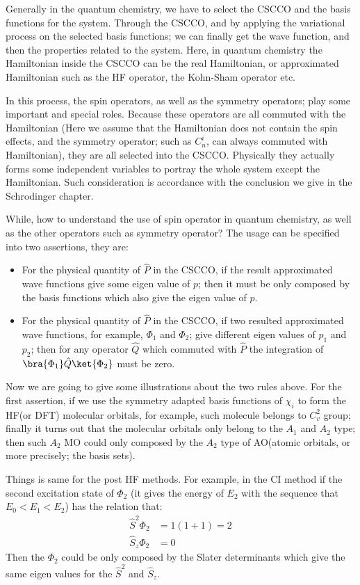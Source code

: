 Generally in the quantum chemistry, we have to select the CSCCO and
the basis functions for the system. Through the CSCCO, and by
applying the variational process on the selected basis functions; we
can finally get the wave function, and then the properties related
to the system. Here, in quantum chemistry the Hamiltonian inside the
CSCCO can be the real Hamiltonian, or approximated Hamiltonian such
as the HF operator, the Kohn-Sham operator etc.

In this process, the spin operators, as well as the symmetry
operators; play some important and special roles. Because these
operators are all commuted with the Hamiltonian (Here we assume that
the Hamiltonian does not contain the spin effects, and the symmetry
operator; such as $C^{i}_{n}$, can always commuted with
Hamiltonian), they are all selected into the CSCCO. Physically they
actually forms some independent variables to portray the whole
system except the Hamiltonian. Such consideration is accordance with
the conclusion we give in the Schrodinger chapter.

While, how to understand the use of spin operator in quantum
chemistry, as well as the other operators such as symmetry operator?
The usage can be specified into two assertions, they are:
\begin{itemize}
  \item  For the physical quantity of $\hat{P}$ in the CSCCO, if
the result approximated wave functions give some eigen value of $p$;
then it must be only composed by the basis functions which also give
the eigen value of $p$.
  \item  For the physical quantity of $\hat{P}$ in the CSCCO, if two
resulted approximated wave functions, for example, $\Phi_{1}$ and
$\Phi_{2}$; give different eigen values of $p_{1}$ and $p_{2}$; then
for any operator $\hat{Q}$ which commuted with $\hat{P}$ the
integration of $\bra{\Phi_{1}}\hat{Q}\ket{\Phi_{2}}$ must be zero.
\end{itemize}

Now we are going to give some illustrations about the two rules
above. For the first assertion, if we use the symmetry adapted basis
functions of $\chi_{i}$ to form the HF(or DFT) molecular orbitals, for
example, such molecule belongs to $C^{2}_{v}$ group; finally it
turns out that the molecular orbitals only belong to the $A_{1}$ and
$A_{2}$ type; then such $A_{2}$ MO could only composed
by the $A_{2}$ type of AO(atomic orbitals, or more precisely; the
basis sets).

Things is same for the post HF methods. For example, in the CI method
if the second excitation state of $\Phi_{2}$ (it gives the energy of
$E_{2}$ with the sequence that $E_{0} < E_{1} < E_{2}$) has the
relation that:
\begin{align}\label{}
\hat{S}^{2}\Phi_{2} &= 1(1+1) = 2 \nonumber \\
\hat{S}_{z}\Phi_{2} &= 0
\end{align}
Then the $\Phi_{2}$ could be only composed by the Slater determinants
which give the same eigen values for the $\hat{S}^{2}$ and
$\hat{S}_{z}$.

